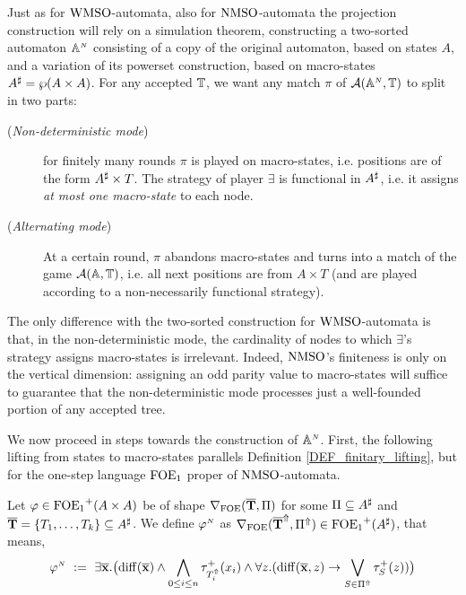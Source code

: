 Just as for $\mathrm{WMSO}$-automata, also for $\mathrm{NMSO}$-automata the projection construction will rely on a simulation theorem, constructing a two-sorted automaton $\mathbb{A}^{{\scriptscriptstyle N}}$ consisting of a copy of the original automaton, based on states $A$, and a variation of its powerset construction, based on macro-states $A^{\sharp} = \wp(A \times A)$. For any accepted $\mathbb{T}$, we want any match $\pi$ of $\mathcal{A}(\mathbb{A}^{{\scriptscriptstyle N}},\mathbb{T})$ to split in two parts:
\begin{description}
  \item[(\textit{Non-deterministic mode})] for finitely many rounds $\pi$ is played on macro-states, i.e. positions are of the form $A^{\sharp} \times T$. The strategy of player $\exists$ is functional in $A^{\sharp}$, i.e. it assigns \emph{at most one macro-state} to each node.
  \item[(\textit{Alternating mode})] At a certain round, $\pi$ abandons macro-states and turns into a match of the game $\mathcal{A}(\mathbb{A},\mathbb{T})$, i.e. all next positions are from $A \times T$ (and are played according to a non-necessarily functional strategy). %
\end{description}
The only difference with the two-sorted construction for $\mathrm{WMSO}$-automata is that, in the non-deterministic mode, the cardinality of nodes to which $\exists$'s strategy assigns macro-states is irrelevant. Indeed, $\mathrm{NMSO}$'s finiteness is only on the vertical dimension: assigning an odd parity value to macro-states will suffice to guarantee that the non-deterministic mode processes just a well-founded portion of any accepted tree.

We now proceed in steps towards the construction of $\mathbb{A}^{{\scriptscriptstyle N}}$. First, the following lifting from states to macro-states parallels Definition \ref{DEF_finitary_lifting}, but for the one-step language $\mathrm{FOE}_1$ proper of $\mathrm{NMSO}$-automata.

\begin{definition}\label{DEF_noetherian_lifting}
Let $\varphi \in {\ensuremath{\mathrm{FOE}_1}}^+(A \times A)$ be of shape $\nabla_{\mathrm{FOE}}(\overline{{\mathbf{T}}},\Pi)$ for some $\Pi \subseteq A^{\sharp}$ and $\overline{{\mathbf{T}}} = \{T_1,\dots,T_k\} \subseteq A^{\sharp}$. We define $\varphi^{{\scriptscriptstyle N}}$ as $\nabla_{\mathrm{FOE}}(\overline{{\mathbf{T}}}^{\Uparrow},\Pi^{\Uparrow}) \in {\ensuremath{\mathrm{FOE}_1}}^+(A^{\sharp} )$, that means,
\begin{equation}\label{eq:unfoldingNablaofoe}
\varphi^{\noet} \ \df \ 
    \exists \vlist{x}.\big(\arediff{\vlist{x}} \land \bigwedge_{0 \leq i \leq n} \tau^+_{\lift{T}_i}(x_i)
\land 
    \forall z.(\arediff{\vlist{x},z} \lthen \bigvee_{S\in \lift{\Pi} } \tau^+_S(z))\big)
\end{equation}
\end{definition}

